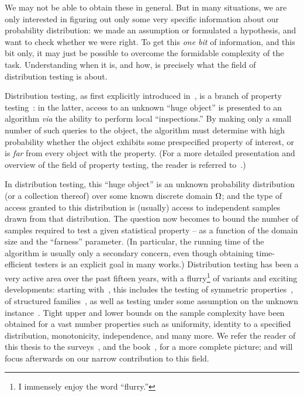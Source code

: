 We may not be able to obtain these in general. But in many situations, we are only interested in figuring out only some very specific information about our probability distribution: we made an assumption or formulated a hypothesis, and want to check whether we were right. To get this \emph{one bit} of information, and this bit only, it may just be possible to overcome the formidable complexity of the task. Understanding when it is, and how, is precisely what the field of distribution testing is about.

Distribution testing, as first explicitly introduced in~\cite{BFRSW:00}, is a branch of property testing~\cite{RS:96,GGR:98}: in the latter, access to an unknown ``huge object'' is presented to an algorithm \textit{via} the ability to perform local ``inspections.'' By making only a small number of such queries to the object, the algorithm must determine with high probability whether the object exhibits some prespecified property of interest, or is \emph{far} from every object with the property. (For a more detailed presentation and overview of the field of property testing, the reader is referred to~\cite{Fischer:01,Ron:08,Ron:10,Goldreich:10,Gol:17,BY:17}.)

In distribution testing, this ``huge object'' is an unknown probability distribution (or a collection thereof) over some known discrete domain ${\Omega}$; and the type of access granted to this distribution is (usually) access to independent samples drawn from that distribution. The question now becomes to bound the number of samples required to test a given statistical property -- as a function of the domain size and the ``farness'' parameter. (In particular, the running time of the algorithm is usually only a secondary concern, even though obtaining time-efficient testers is an explicit goal in many works.) Distribution testing has been a very active area over the past fifteen years, with a flurry\footnote{I immensely enjoy the word ``flurry.''}{} of variants and exciting developments: starting with~\cite{GRexp:00,BFRSW:10,BFFKRW:01}, this includes the testing of symmetric properties~\cite{RRSS:09,Valiant:11,VV:11:stoc,ValiantValiant:11}, of structured families~\cite{BKR:04,ILR:12,AD:15,Canonne:15,ADK:15,CDGR:16,Canonne:16}, as well as testing under some assumption on the unknown instance~\cite{RS:09,DDSVV:13,DKN:15,DKN:15:FOCS}. Tight upper and lower bounds on the sample complexity have been obtained for a vast number properties such as uniformity, identity to a specified distribution, monotonicity, independence, and many more. We refer the reader of this thesis to the surveys~\cite{Rubinfeld:12:Survey,Canonne:15:Survey}, and the book~\cite{Gol:17}, for a more complete picture; and will focus afterwards on our narrow contribution to this field.

